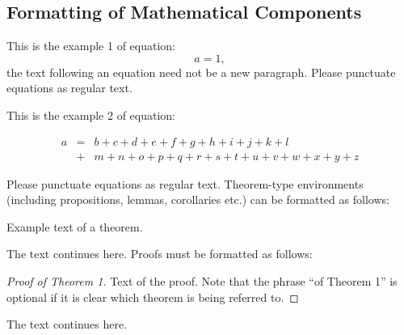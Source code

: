 \begin{paracol}{2}
\subsection{Formatting of Mathematical Components}

This is the example 1 of equation:
\begin{equation}
a = 1,
\end{equation}
the text following an equation need not be a new paragraph. Please punctuate equations as regular text.

This is the example 2 of equation:
\end{paracol}
\nointerlineskip
\begin{eqnarray}
a &=& b + c + d + e + f + g + h + i + j + k + l\nonumber \\
 &+& m + n + o + p + q + r + s + t + u + v + w + x + y + z %
\end{eqnarray}






\begin{paracol}{2}
\linenumbers
\switchcolumn
Please punctuate equations as regular text. Theorem-type environments (including propositions, lemmas, corollaries etc.) can be formatted as follows:
\begin{Theorem}
Example text of a theorem.
\end{Theorem}

The text continues here. Proofs must be formatted as follows:

\begin{proof}[Proof of Theorem 1]
Text of the proof. Note that the phrase ``of Theorem 1'' is optional if it is clear which theorem is being referred to.
\end{proof}
The text continues here.

\end{paracol}
